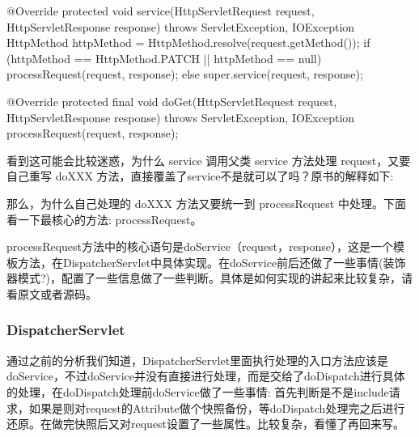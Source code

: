 \begin{Java}
@Override
protected void service(HttpServletRequest request, HttpServletResponse response) throws ServletException, IOException {
    HttpMethod httpMethod = HttpMethod.resolve(request.getMethod());
    if (httpMethod == HttpMethod.PATCH || httpMethod == null) {
        processRequest(request, response);
    }
    else {
        super.service(request, response);
    }
}

@Override
protected final void doGet(HttpServletRequest request, HttpServletResponse response)
        throws ServletException, IOException {
    processRequest(request, response);
}
\end{Java}

看到这可能会比较迷惑，为什么 service 调用父类 service 方法处理 request，又要自己重写 doXXX 方法，直接覆盖了service不是就可以了吗？原书的解释如下:


那么，为什么自己处理的 doXXX 方法又要统一到 processRequest 中处理。下面看一下最核心的方法: processRequest。

processRequest方法中的核心语句是doService（request，response），这是一个模板方法，在DispatcherServlet中具体实现。在doService前后还做了一些事情(装饰器模式?)，配置了一些信息做了一些判断。具体是如何实现的讲起来比较复杂，请看原文或者源码。

\subsubsection{DispatcherServlet}

通过之前的分析我们知道，DispatcherServlet里面执行处理的入口方法应该是doService，不过doService并没有直接进行处理，而是交给了doDispatch进行具体的处理，在doDispatch处理前doService做了一些事情: 首先判断是不是include请求，如果是则对request的Attribute做个快照备份，等doDispatch处理完之后进行还原。在做完快照后又对request设置了一些属性。比较复杂，看懂了再回来写。

